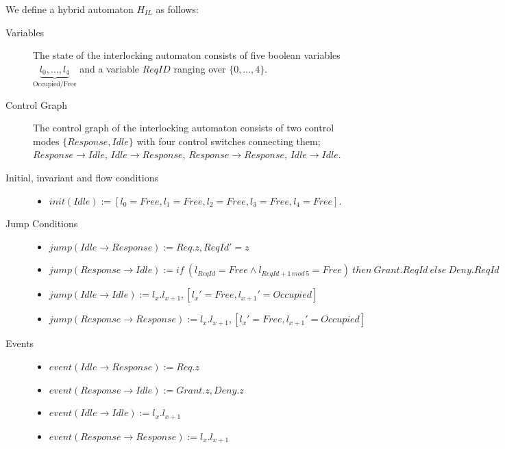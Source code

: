 \begin{mydef}
We define a hybrid automaton $H_{IL}$ as follows:
\begin{description}
\item[Variables] The state of the interlocking automaton consists of five boolean variables  $\underbrace{l_0, \ldots , l_4}_\text{Occupied/Free}$ and a variable $ReqID$ ranging over $\{0 , \ldots , 4 \}$.

\item[Control Graph] The control graph of the interlocking automaton consists of two control modes $\{Response, Idle \}$ with four control switches connecting them; $Response \to Idle$, $Idle \to Response$, $Response \to Response$, $Idle \to Idle$.

\item[Initial, invariant and flow conditions] \hspace*{0mm}
	\begin{itemize}
	\item $init(Idle) := [l_0 = Free, l_1 = Free, l_2 = Free, l_3 = Free, l_4 = Free]$.

	\end{itemize}

\item[Jump Conditions] \hspace*{0mm}

	\begin{itemize}
	\item $jump(Idle \to Response) :=  Req.z , ReqId' = z$

	
	\item $jump(Response \to Idle) := if \ (l_{ReqId} = Free \wedge l_{ReqId +1 \, mod \, 5} = Free) \ then \ Grant. ReqId \ else \ Deny.ReqId$ 

	\item $jump(Idle \to Idle) := l_x. l_{x+1} , [l_x' = Free, l_{x+1}' = Occupied]$

	\item $jump(Response \to Response) := l_x. l_{x+1} , [l_x' = Free, l_{x+1}' = Occupied]$


	\end{itemize}

\item[Events] \hspace*{0mm}
\begin{itemize}
	\item $event (Idle \to Response) := Req.z$
	\item $event(Response \to Idle) :={Grant.z,Deny.z}$
	\item $event(Idle \to Idle) := l_x.l_{x+1}$
	\item $event(Response \to Response) := l_x.l_{x+1}$	
\end{itemize}

\end{description}
\end{mydef}

